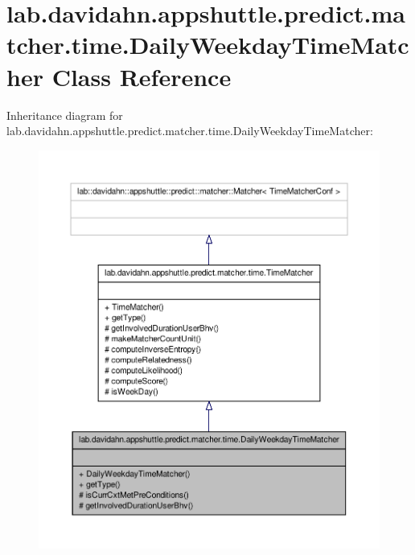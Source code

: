 \hypertarget{classlab_1_1davidahn_1_1appshuttle_1_1predict_1_1matcher_1_1time_1_1_daily_weekday_time_matcher}{\section{lab.\-davidahn.\-appshuttle.\-predict.\-matcher.\-time.\-Daily\-Weekday\-Time\-Matcher \-Class \-Reference}
\label{classlab_1_1davidahn_1_1appshuttle_1_1predict_1_1matcher_1_1time_1_1_daily_weekday_time_matcher}
}


\-Inheritance diagram for lab.\-davidahn.\-appshuttle.\-predict.\-matcher.\-time.\-Daily\-Weekday\-Time\-Matcher\-:
\nopagebreak
\begin{figure}[H]
\begin{center}
\leavevmode
\includegraphics[width=350pt]{classlab_1_1davidahn_1_1appshuttle_1_1predict_1_1matcher_1_1time_1_1_daily_weekday_time_matcher__inherit__graph}
\end{center}
\end{figure}


